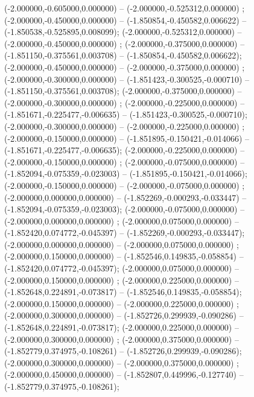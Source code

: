  (-2.000000,-0.605000,0.000000) -- (-2.000000,-0.525312,0.000000) ;
 (-2.000000,-0.450000,0.000000) -- (-1.850854,-0.450582,0.006622) -- (-1.850538,-0.525895,0.008099);
 (-2.000000,-0.525312,0.000000) -- (-2.000000,-0.450000,0.000000) ;
 (-2.000000,-0.375000,0.000000) -- (-1.851150,-0.375561,0.003708) -- (-1.850854,-0.450582,0.006622);
 (-2.000000,-0.450000,0.000000) -- (-2.000000,-0.375000,0.000000) ;
 (-2.000000,-0.300000,0.000000) -- (-1.851423,-0.300525,-0.000710) -- (-1.851150,-0.375561,0.003708);
 (-2.000000,-0.375000,0.000000) -- (-2.000000,-0.300000,0.000000) ;
 (-2.000000,-0.225000,0.000000) -- (-1.851671,-0.225477,-0.006635) -- (-1.851423,-0.300525,-0.000710);
 (-2.000000,-0.300000,0.000000) -- (-2.000000,-0.225000,0.000000) ;
 (-2.000000,-0.150000,0.000000) -- (-1.851895,-0.150421,-0.014066) -- (-1.851671,-0.225477,-0.006635);
 (-2.000000,-0.225000,0.000000) -- (-2.000000,-0.150000,0.000000) ;
 (-2.000000,-0.075000,0.000000) -- (-1.852094,-0.075359,-0.023003) -- (-1.851895,-0.150421,-0.014066);
 (-2.000000,-0.150000,0.000000) -- (-2.000000,-0.075000,0.000000) ;
 (-2.000000,0.000000,0.000000) -- (-1.852269,-0.000293,-0.033447) -- (-1.852094,-0.075359,-0.023003);
 (-2.000000,-0.075000,0.000000) -- (-2.000000,0.000000,0.000000) ;
 (-2.000000,0.075000,0.000000) -- (-1.852420,0.074772,-0.045397) -- (-1.852269,-0.000293,-0.033447);
 (-2.000000,0.000000,0.000000) -- (-2.000000,0.075000,0.000000) ;
 (-2.000000,0.150000,0.000000) -- (-1.852546,0.149835,-0.058854) -- (-1.852420,0.074772,-0.045397);
 (-2.000000,0.075000,0.000000) -- (-2.000000,0.150000,0.000000) ;
 (-2.000000,0.225000,0.000000) -- (-1.852648,0.224891,-0.073817) -- (-1.852546,0.149835,-0.058854);
 (-2.000000,0.150000,0.000000) -- (-2.000000,0.225000,0.000000) ;
 (-2.000000,0.300000,0.000000) -- (-1.852726,0.299939,-0.090286) -- (-1.852648,0.224891,-0.073817);
 (-2.000000,0.225000,0.000000) -- (-2.000000,0.300000,0.000000) ;
 (-2.000000,0.375000,0.000000) -- (-1.852779,0.374975,-0.108261) -- (-1.852726,0.299939,-0.090286);
 (-2.000000,0.300000,0.000000) -- (-2.000000,0.375000,0.000000) ;
 (-2.000000,0.450000,0.000000) -- (-1.852807,0.449996,-0.127740) -- (-1.852779,0.374975,-0.108261);
